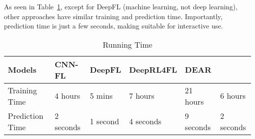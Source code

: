  As seen in Table~\ref{tab:time}, except
for DeepFL (machine learning, not deep learning), other approaches
have similar training and prediction time. Importantly, prediction
time is just a few seconds, making {\tool} suitable for interactive
use.



\begin{table}[t]
	\caption{Running Time}
	\vspace{-12pt}
	\begin{center}
        \tabcolsep 2pt
		\footnotesize
		\renewcommand{\arraystretch}{1} 
		\begin{tabular}{p{1.6cm}<{\centering}|p{1cm}<{\centering}|p{1cm}<{\centering}|p{1.2cm}<{\centering}|p{1cm}<{\centering}|p{1.1cm}<{\centering}}
			\hline
			Models          & CNN-FL & DeepFL & DeepRL4FL & DEAR & {\tool} \\\hline
			Training Time & 4 hours & 5 mins & 7 hours & 21 hours & 6 hours \\
			Prediction Time & 2 seconds & 1 second & 4 seconds &9 seconds & 2 seconds\\ 
			\hline
		\end{tabular}
		\label{tab:time}
	\end{center}
\vspace{-5pt}
\end{table}
